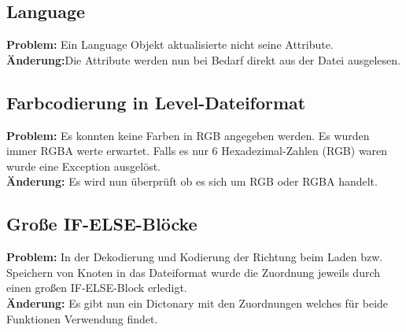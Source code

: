\subsection{Language}
\textbf{Problem:}
Ein Language Objekt aktualisierte nicht seine Attribute.
\\
\textbf{Änderung:}Die Attribute werden nun bei Bedarf direkt aus der Datei ausgelesen.

\subsection{Farbcodierung in Level-Dateiformat}
\textbf{Problem:}
Es konnten keine Farben in RGB angegeben werden. Es wurden immer RGBA werte erwartet.
Falls es nur 6 Hexadezimal-Zahlen (RGB) waren wurde eine Exception ausgelöst.
\\
\textbf{Änderung:} Es wird nun überprüft ob es sich um RGB oder RGBA handelt.

\subsection{Große IF-ELSE-Blöcke}
\textbf{Problem:}
In der Dekodierung und Kodierung der Richtung beim Laden bzw. Speichern von Knoten in das Dateiformat wurde die Zuordnung jeweils durch einen großen IF-ELSE-Block erledigt.
\\
\textbf{Änderung:} Es gibt nun ein Dictonary mit den Zuordnungen welches für beide Funktionen Verwendung findet.










